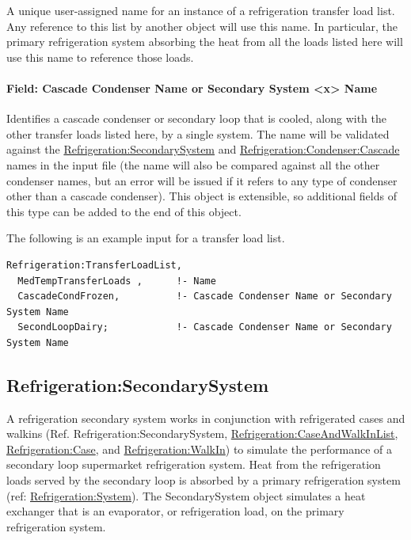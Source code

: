 A unique user-assigned name for an instance of a refrigeration transfer load list. Any reference to this list by another object will use this name. In particular, the primary refrigeration system absorbing the heat from all the loads listed here will use this name to reference those loads.

\paragraph{Field: Cascade Condenser Name or Secondary System \textless{}x\textgreater{} Name}\label{field-cascade-condenser-name-or-secondary-system-name}

Identifies a cascade condenser or secondary loop that is cooled, along with the other transfer loads listed here, by a single system. The name will be validated against the \hyperref[refrigerationsecondarysystem]{Refrigeration:SecondarySystem} and \hyperref[refrigerationcondensercascade]{Refrigeration:Condenser:Cascade} names in the input file (the name will also be compared against all the other condenser names, but an error will be issued if it refers to any type of condenser other than a cascade condenser).  This object is extensible, so additional fields of this type can be added to the end of this object.

The following is an example input for a transfer load list.

\begin{lstlisting}
Refrigeration:TransferLoadList,
  MedTempTransferLoads ,      !- Name
  CascadeCondFrozen,          !- Cascade Condenser Name or Secondary System Name
  SecondLoopDairy;            !- Cascade Condenser Name or Secondary System Name
\end{lstlisting}

\subsection{Refrigeration:SecondarySystem}\label{refrigerationsecondarysystem}

A refrigeration secondary system works in conjunction with refrigerated cases and walkins (Ref. Refrigeration:SecondarySystem, \hyperref[refrigerationcaseandwalkinlist]{Refrigeration:CaseAndWalkInList}, \hyperref[refrigerationcase]{Refrigeration:Case}, and \hyperref[refrigerationwalkin]{Refrigeration:WalkIn}) to simulate the performance of a secondary loop supermarket refrigeration system. Heat from the refrigeration loads served by the secondary loop is absorbed by a primary refrigeration system (ref: \hyperref[refrigerationsystem]{Refrigeration:System}). The SecondarySystem object simulates a heat exchanger that is an evaporator, or refrigeration load, on the primary refrigeration system.

